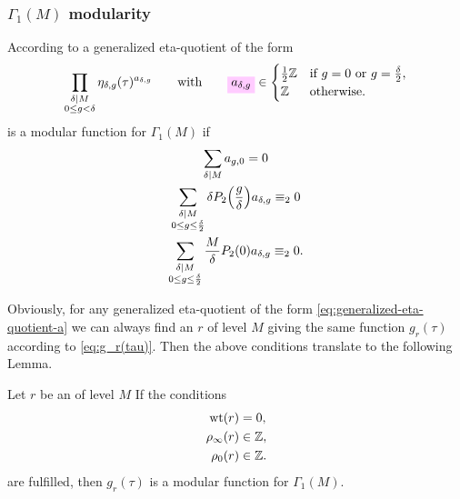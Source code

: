 \documentclass{article}
\begin{document}
\subsubsection{$\Gamma_1(M)$ modularity}

According to \cite[Thm.~3]{Robins_GeneralizedDedekindEtaProducts_1994}
a generalized eta-quotient of the form
\begin{gather}
  \prod_{\substack{\divides{\delta}{M}\\ 0\le g < \delta}}
  \eta_{\delta,g}(\tau)^{a_{\delta,g}}
  \qquad
  \text{with}
  \qquad
  \defineNotation[a-delta-g]{a_{\delta,g}}\in
  \begin{cases}
    \frac{1}{2}\setZ & \text{if $g=0$ or $g=\frac{\delta}{2}$},\\
    \setZ & \text{otherwise}.
  \end{cases}
  \label{eq:generalized-eta-quotient-a}
\end{gather}
is a modular function for $\Gamma_1(M)$ if
\begin{gather}
  \sum_{\delta \mid M} a_{g,0} = 0\\
  \sum_{\substack{\delta \mid M\\0 \le g \le \frac{\delta}{2}}}
  \delta P_2\Bigl(\frac{g}{\delta}\Bigr) a_{\delta,g} \equiv_2 0\\
  \sum_{\substack{\delta \mid M\\0 \le g \le \frac{\delta}{2}}}
  \frac{M}{\delta} P_2(0) a_{\delta,g} \equiv_2 0.
\end{gather}

Obviously, for any generalized eta-quotient of the form
\eqref{eq:generalized-eta-quotient-a} we can always find an
 $r$ of level $M$ giving the same function
$g_r(\tau)$ according to \eqref{eq:g_r(tau)}. Then the above
conditions translate to the following Lemma.

\begin{Lemma}
  \label{thm:modular-eta-quotient-gamma1}
  Let $r$ be an  of level $M$ If the
  conditions
  \begin{align}
    \operatorname{wt}(r) &= 0,  \label{eq:generalized-weight}\\
    \rho_\infty(r) &\in \mathbb{Z}, \label{eq:rhoinfinity}\\
    \rho_0(r) &\in \mathbb{Z}. \label{eq:rho0}
  \end{align}
  are fulfilled, then $g_r(\tau)$ is a modular function for
  $\Gamma_1(M)$.
\end{Lemma}
\end{document}
